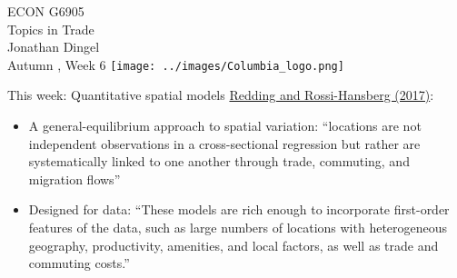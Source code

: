 \documentclass[11pt,notes=hide,aspectratio=169]{beamer}
\begin{document}
\begin{frame}[plain]
\begin{center}
\large
\textcolor{columbiadarkblue}{ECON G6905\\
Topics in Trade\\ 
Jonathan Dingel\\
Autumn \the\year, Week 6}
\vfill 
\texttt{[image: ../images/Columbia\_logo.png]}
\end{center}
\end{frame}
\begin{frame}{This week: Quantitative spatial models}
\href{https://doi.org/10.1146/annurev-economics-063016-103713}{Redding and Rossi-Hansberg (2017)}:
\begin{itemize}
\item A general-equilibrium approach to spatial variation:
``locations are not independent observations in a cross-sectional regression but rather are systematically linked to one another through trade, commuting, and migration flows''
\item Designed for data: 
``These models are rich enough to incorporate first-order features of the data, such as large numbers of locations with heterogeneous geography, productivity, amenities, and local factors, as well as trade and commuting costs.''
\end{itemize}
\end{frame}
\end{document}
